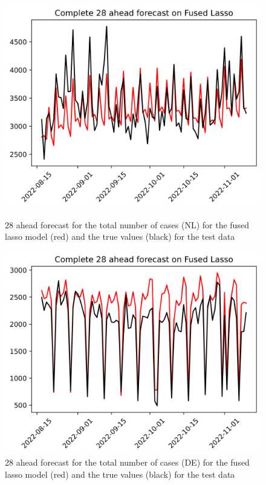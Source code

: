 \begin{figure}

\begin{minipage}{.45\textwidth}
  \centering
  \includegraphics[width=\linewidth]{pics/28_ah/Complete_28_ahead_Fused Lasso.png}
  \caption{28 ahead forecast for the total number of cases (NL) for the fused lasso model (red) and the true values (black) for the test data}
  \label{fig:tot_cases_fc_28_flasso}
\end{minipage}
\begin{minipage}{.45\textwidth}
  \centering
  \includegraphics[width=\linewidth]{pics/28_ah/DE_Complete_28_ahead_Fused Lasso.png}
  \caption{28 ahead forecast for the total number of cases (DE) for the fused lasso model (red) and the true values (black) for the test data}
  \label{fig:tot_cases_fc_28_flasso_DE}
\end{minipage}

\end{figure}
